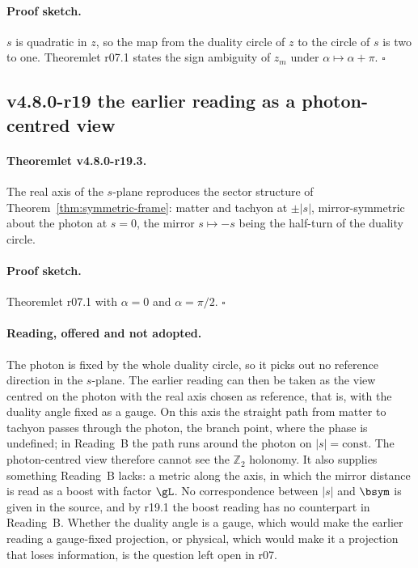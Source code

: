 \paragraph{Proof sketch.}
\(s\) is quadratic in \(z\), so the map from the duality circle of \(z\) to the circle of \(s\) is two to one.
Theoremlet r07.1 states the sign ambiguity of \(z_m\) under \(\alpha\mapsto\alpha+\pi\).  \(\square\)

\subsection*{v4.8.0-r19 the earlier reading as a photon-centred view}
\label{subsec:v480-r19-photon-centred}

\paragraph{Theoremlet v4.8.0-r19.3.}
The real axis of the \(s\)-plane reproduces the sector structure of Theorem~\ref{thm:symmetric-frame}: matter and
tachyon at \(\pm|s|\), mirror-symmetric about the photon at \(s=0\), the mirror \(s\mapsto-s\) being the half-turn of
the duality circle.

\paragraph{Proof sketch.}
Theoremlet r07.1 with \(\alpha=0\) and \(\alpha=\pi/2\).  \(\square\)

\paragraph{Reading, offered and not adopted.}
The photon is fixed by the whole duality circle, so it picks out no reference direction in the \(s\)-plane.  The
earlier reading can then be taken as the view centred on the photon with the real axis chosen as reference, that is,
with the duality angle fixed as a gauge.  On this axis the straight path from matter to tachyon passes through the
photon, the branch point, where the phase is undefined; in Reading~B the path runs around the photon on
\(|s|=\mathrm{const}\).  The photon-centred view therefore cannot see the \(\mathbb Z_2\) holonomy.  It also supplies
something Reading~B lacks: a metric along the axis, in which the mirror distance is read as a boost with factor
\(\gL\).  No correspondence between \(|s|\) and \(\bsym\) is given in the source, and by r19.1 the boost reading has no
counterpart in Reading~B.  Whether the duality angle is a gauge, which would make the earlier reading a gauge-fixed
projection, or physical, which would make it a projection that loses information, is the question left open in r07.

